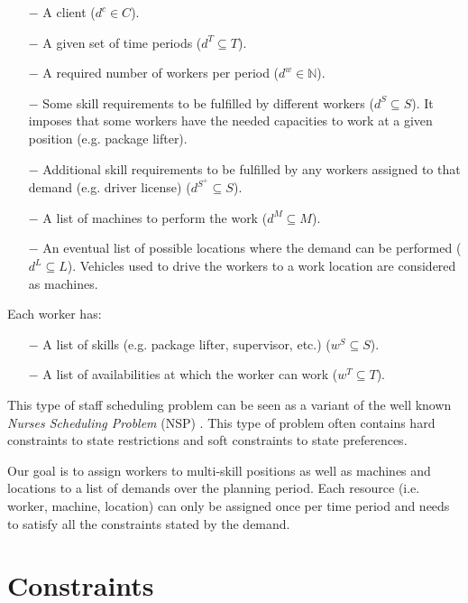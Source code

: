 \documentclass[../thesis.tex]{subfiles}
\begin{document}
\begin{itemize}
  \item[$-$] A client ($d^c \in C$).
  \item[$-$] A given set of time periods ($d^T \subseteq T$).
  \item[$-$] A required number of workers per period ($d^w \in \mathbb{N}$).
  \item[$-$] Some skill requirements to be fulfilled by different workers ($d^S \subseteq S$).
  It imposes that some workers have the needed capacities to work at a given position (e.g. package lifter).
  \item[$-$] Additional skill requirements to be fulfilled by any workers assigned to that demand (e.g. driver license) ($d^{S^{+}} \subseteq S$).
  \item[$-$] A list of machines to perform the work ($d^M \subseteq M$).
  \item[$-$] An eventual list of possible locations where the demand can be performed ($d^L \subseteq L$).
  Vehicles used to drive the workers to a work location are considered as machines.
\end{itemize}


Each worker has:

\begin{itemize}
  \item[$-$] A list of skills (e.g. package lifter, supervisor, etc.) ($w^S \subseteq S$).
  \item[$-$] A list of availabilities at which the worker can work ($w^T \subseteq T$).  
\end{itemize}


This type of staff scheduling problem can be seen as a variant of the 
well known \emph{Nurses Scheduling Problem} (NSP) \cite{Burke2004}. 
This type of problem often contains hard constraints to state restrictions 
and soft constraints to state preferences. 




Our goal is to assign workers to multi-skill positions as well as machines and locations to a list of demands over the planning period.
Each resource (i.e. worker, machine, location) can only be assigned once per time period and needs to satisfy all the constraints stated by the demand. 

\section{Constraints}
\end{document}
